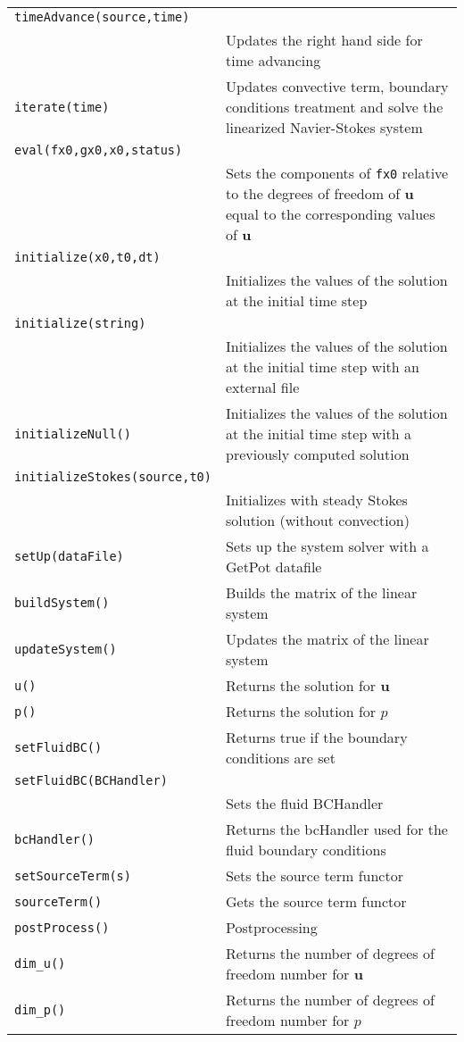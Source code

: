\documentclass[11pt]{article}
\begin{document}
\begin{center}
\begin{longtable}{p{3cm}p{8cm}}
	\hline
	\texttt{timeAdvance(source,time)} \\
	& Updates the right hand side for time advancing\\
	\texttt{iterate(time)} & Updates convective term, boundary conditions treatment and solve the linearized Navier-Stokes system\\
	\texttt{eval(fx0,gx0,x0,status)} \\
	& Sets the components of \texttt{fx0} relative to the degrees of freedom of $\mathbf{u}$ equal to the corresponding values of $\mathbf{u}$\\
	\texttt{initialize(x0,t0,dt)} \\
	& Initializes the values of the solution at the initial time step\\
	\texttt{initialize(string)} \\
	& Initializes the values of the solution at the initial time step with an external file\\
	\texttt{initializeNull()} & Initializes the values of the solution at the initial time step with a previously computed solution\\
	\texttt{initializeStokes(source,t0)} \\
	& Initializes with steady Stokes solution (without convection)\\
	\texttt{setUp(dataFile)} & Sets up the system solver with a GetPot datafile\\
	\texttt{buildSystem()} & Builds the matrix of the linear system\\
	\texttt{updateSystem()} & Updates the matrix of the linear system\\
	\texttt{u()} & Returns the solution for $\mathbf{u}$\\
	\texttt{p()} & Returns the solution for $p$\\
	\texttt{setFluidBC()} & Returns true if the boundary conditions are set\\
	\texttt{setFluidBC(BCHandler)} \\
	& Sets the fluid BCHandler\\
	\texttt{bcHandler()} & Returns the bcHandler used for the fluid boundary conditions\\
	\texttt{setSourceTerm(s)} & Sets the source term functor\\
	\texttt{sourceTerm()} & Gets the source term functor\\
	\texttt{postProcess()} & Postprocessing\\
	\texttt{dim\_u()} & Returns the number of degrees of freedom number for $\mathbf{u}$\\
	\texttt{dim\_p()} & Returns the number of degrees of freedom number for $p$\\
	\hline
\end{longtable}
\end{center}
\end{document}
